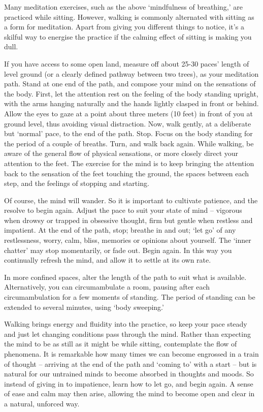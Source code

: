 
Many meditation exercises, such as the above `mindfulness of breathing,'
are practiced while sitting. However, walking is commonly alter\-nated
with sitting as a form for meditation. Apart from giving you dif\-ferent
things to notice, it's a skilful way to energise the practice if the
calming effect of sitting is making you dull.

If you have access to some open land, measure off about 25-30 paces'
length of level ground (or a clearly defined pathway between two trees),
as your meditation path. Stand at one end of the path, and compose your
mind on the sensations of the body. First, let the attention rest on the
feeling of the body standing upright, with the arms hanging naturally
and the hands lightly clasped in front or behind. Allow the eyes to gaze
at a point about three meters (10 feet) in front of you at ground
level, thus avoiding visual distraction. Now, walk gently, at a
deliberate but `normal' pace, to the end of the path. Stop. Focus on the
body standing for the period of a couple of breaths. Turn, and walk back
again. While walking, be aware of the general flow of physical
sensations, or more closely direct your attention to the feet. The
exercise for the mind is to keep bringing the attention back to the
sensation of the feet touching the ground, the spaces between each step,
and the feelings of stopping and starting.

Of course, the mind will wander. So it is important to cultivate
patience, and the resolve to begin again. Adjust the pace to suit your
state of mind -- vigorous when drowsy or trapped in obsessive thought,
firm but gentle when restless and impatient. At the end of the path,
stop; breathe in and out; `let go' of any restlessness, worry, calm,
bliss, memories or opinions about yourself. The `inner chatter' may stop
momentarily, or fade out. Begin again. In this way you continually
refresh the mind, and allow it to settle at its own rate.

\vspace*{-0.5\onelineskip}
In more confined spaces, alter the length of the path to suit what is
available. Alternatively, you can circumambulate a room, pausing after
each circumambulation for a few moments of standing. The period of
standing can be extended to several minutes, using `body sweeping.'

\vspace*{-0.5\onelineskip}
Walking brings energy and fluidity into the practice, so keep your pace
steady and just let changing conditions pass through the mind. Rather
than expecting the mind to be as still as it might be while sitting,
contemplate the flow of phenomena. It is remarkable how many times we
can become engrossed in a train of thought -- arriving at the end of the
path and `coming to' with a start -- but is natural for our untrained
minds to become absorbed in thoughts and moods. So instead of giving in
to impatience, learn how to let go, and begin again. A sense of ease and
calm may then arise, allowing the mind to become open and clear in a
natural, unforced way.

